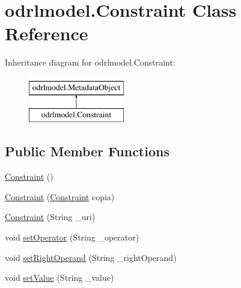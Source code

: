 \hypertarget{classodrlmodel_1_1_constraint}{\section{odrlmodel.\-Constraint Class Reference}
\label{classodrlmodel_1_1_constraint}
}
Inheritance diagram for odrlmodel.\-Constraint\-:\begin{figure}[H]
\begin{center}
\leavevmode
\includegraphics[height=2.000000cm]{classodrlmodel_1_1_constraint}
\end{center}
\end{figure}
\subsection*{Public Member Functions}
\begin{DoxyCompactItemize}
\item 
\hyperlink{classodrlmodel_1_1_constraint_adb03e20fbc5184936dc849508e8a9e02}{Constraint} ()
\item 
\hyperlink{classodrlmodel_1_1_constraint_a540f08813d46fd9e006d1f19fa1e5139}{Constraint} (\hyperlink{classodrlmodel_1_1_constraint}{Constraint} copia)
\item 
\hyperlink{classodrlmodel_1_1_constraint_a3a4d2d03c916c0b5c51de568a43d9761}{Constraint} (String \-\_\-uri)
\item 
void \hyperlink{classodrlmodel_1_1_constraint_a6813d28f7e2eb0375a9247c0c60437ad}{set\-Operator} (String \-\_\-operator)
\item 
void \hyperlink{classodrlmodel_1_1_constraint_a2d0a36345a3a99f683976c5c900f2276}{set\-Right\-Operand} (String \-\_\-right\-Operand)
\item 
void \hyperlink{classodrlmodel_1_1_constraint_a00c68186d9d61ca7c995e260bc595c7b}{set\-Value} (String \-\_\-value)
\end{DoxyCompactItemize}

